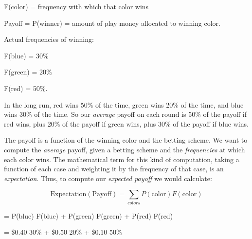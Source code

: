 \bigskip

{\centering
 F(color) = frequency with which that color wins
\par}


\bigskip

{\centering
 Payoff = P(winner) = amount of play money allocated to winning
color.
\par}


\bigskip

{
 Actual frequencies of winning:}

{\centering
 F(blue) = 30\%
\par}


\bigskip

{\centering
 F(green) = 20\%
\par}


\bigskip

{\centering
 F(red) = 50\%.
\par}


\bigskip

{
 In the long run, red wins 50\% of the time, green wins 20\% of the
time, and blue wins 30\% of the time. So our \textit{average} payoff on
each round is 50\% of the payoff if red wins, plus 20\% of the payoff
if green wins, plus 30\% of the payoff if blue wins.}

{
 The payoff is a function of the winning color and the betting
scheme. We want to compute the \textit{average} payoff, given a betting
scheme and the \textit{frequencies} at which each color wins. The
mathematical term for this kind of computation, taking a function of
each case and weighting it by the frequency of that case, is an
\textit{expectation}. Thus, to compute our \textit{expected payoff} we
would calculate:}


\begin{equation*}
  \mathrm{Expectation}(\mathrm{Payof}\mathrm{f}) = \sum_{colors} P(\mathrm{color}) F(\mathrm{color})
\end{equation*}


\bigskip

{\centering
 = P(blue) {\texttimes} F(blue) + P(green) {\texttimes} F(green) +
P(red) {\texttimes} F(red)
\par}


\bigskip

{\centering
 = \$0.40 {\texttimes} 30\% + \$0.50 {\texttimes} 20\% + \$0.10
{\texttimes} 50\%
\par}


